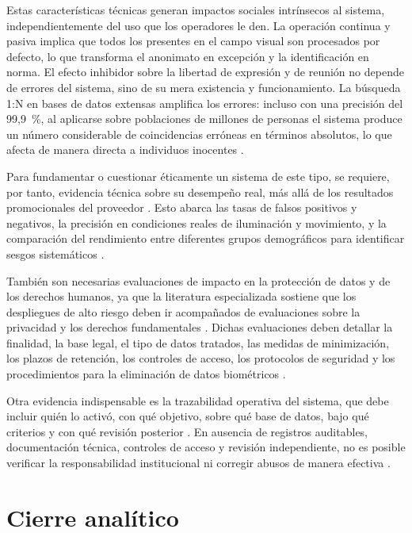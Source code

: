 \documentclass[11pt, a4paper]{article}
\begin{document}
Estas características técnicas generan impactos sociales intrínsecos al sistema, independientemente del uso que los operadores le den. La operación continua y pasiva implica que todos los presentes en el campo visual son procesados por defecto, lo que transforma el anonimato en excepción y la identificación en norma. El efecto inhibidor sobre la libertad de expresión y de reunión no depende de errores del sistema, sino de su mera existencia y funcionamiento. La búsqueda 1:N en bases de datos extensas amplifica los errores: incluso con una precisión del 99,9~\%, al aplicarse sobre poblaciones de millones de personas el sistema produce un número considerable de coincidencias erróneas en términos absolutos, lo que afecta de manera directa a individuos inocentes \citep{grother2019, schmechel2021}.

Para fundamentar o cuestionar éticamente un sistema de este tipo, se requiere, por tanto, evidencia técnica sobre su desempeño real, más allá de los resultados promocionales del proveedor \citep{grother2019, silva2020}. Esto abarca las tasas de falsos positivos y negativos, la precisión en condiciones reales de iluminación y movimiento, y la comparación del rendimiento entre diferentes grupos demográficos para identificar sesgos sistemáticos \citep{grother2019, schmechel2021}.

También son necesarias evaluaciones de impacto en la protección de datos y de los derechos humanos, ya que la literatura especializada sostiene que los despliegues de alto riesgo deben ir acompañados de evaluaciones sobre la privacidad y los derechos fundamentales \citep{martinez2024, gimenez2022}. Dichas evaluaciones deben detallar la finalidad, la base legal, el tipo de datos tratados, las medidas de minimización, los plazos de retención, los controles de acceso, los protocolos de seguridad y los procedimientos para la eliminación de datos biométricos \citep{silva2020, gikay2023}.

Otra evidencia indispensable es la trazabilidad operativa del sistema, que debe incluir quién lo activó, con qué objetivo, sobre qué base de datos, bajo qué criterios y con qué revisión posterior \citep{gikay2023, schmechel2021}. En ausencia de registros auditables, documentación técnica, controles de acceso y revisión independiente, no es posible verificar la responsabilidad institucional ni corregir abusos de manera efectiva \citep{martinez2024, silva2020}.

\section{Cierre analítico}
\end{document}
